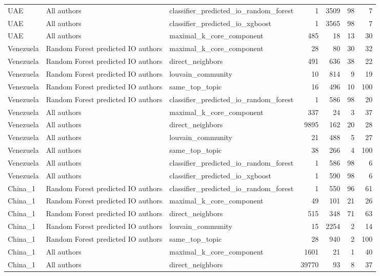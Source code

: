 \begin{tabular}{lllrrrr}
UAE & All authors & classifier\_predicted\_io\_random\_forest & 1 & 3509 & 98 & 7 \\
UAE & All authors & classifier\_predicted\_io\_xgboost & 1 & 3565 & 98 & 7 \\
UAE & All authors & maximal\_k\_core\_component & 485 & 18 & 13 & 30 \\
Venezuela & Random Forest predicted IO authors & maximal\_k\_core\_component & 28 & 80 & 30 & 32 \\
Venezuela & Random Forest predicted IO authors & direct\_neighbors & 491 & 636 & 38 & 22 \\
Venezuela & Random Forest predicted IO authors & louvain\_community & 10 & 814 & 9 & 19 \\
Venezuela & Random Forest predicted IO authors & same\_top\_topic & 16 & 496 & 10 & 100 \\
Venezuela & Random Forest predicted IO authors & classifier\_predicted\_io\_random\_forest & 1 & 586 & 98 & 20 \\
Venezuela & All authors & maximal\_k\_core\_component & 337 & 24 & 3 & 37 \\
Venezuela & All authors & direct\_neighbors & 9895 & 162 & 20 & 28 \\
Venezuela & All authors & louvain\_community & 21 & 488 & 5 & 27 \\
Venezuela & All authors & same\_top\_topic & 38 & 266 & 4 & 100 \\
Venezuela & All authors & classifier\_predicted\_io\_random\_forest & 1 & 586 & 98 & 6 \\
Venezuela & All authors & classifier\_predicted\_io\_xgboost & 1 & 590 & 98 & 6 \\
China\_1 & Random Forest predicted IO authors & classifier\_predicted\_io\_random\_forest & 1 & 550 & 96 & 61 \\
China\_1 & Random Forest predicted IO authors & maximal\_k\_core\_component & 49 & 101 & 21 & 26 \\
China\_1 & Random Forest predicted IO authors & direct\_neighbors & 515 & 348 & 71 & 63 \\
China\_1 & Random Forest predicted IO authors & louvain\_community & 15 & 2254 & 2 & 14 \\
China\_1 & Random Forest predicted IO authors & same\_top\_topic & 28 & 940 & 2 & 100 \\
China\_1 & All authors & maximal\_k\_core\_component & 1601 & 21 & 1 & 40 \\
China\_1 & All authors & direct\_neighbors & 39770 & 93 & 8 & 37 \\

\end{tabular}
